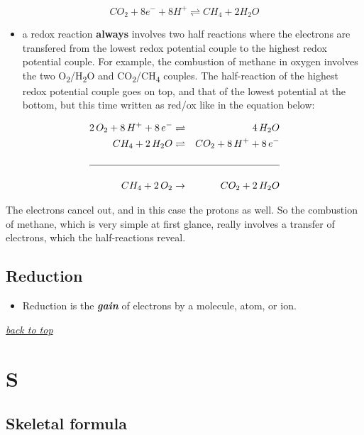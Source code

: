 \documentclass[]{book}
\providecommand{\tightlist}{%
  \setlength{\itemsep}{0pt}\setlength{\parskip}{0pt}}
\theoremstyle{definition}
\theoremstyle{definition}
\theoremstyle{definition}
\theoremstyle{remark}
\begin{document}
\begin{equation}
CO_2 + 8 e^- + 8 H^+ \rightleftharpoons CH_4 + 2 H_2O
\end{equation}

\begin{itemize}
\tightlist
\item
  a redox reaction \textbf{always} involves two half reactions where the
  electrons are transfered from the lowest redox potential couple to the
  highest redox potential couple. For example, the combustion of methane
  in oxygen involves the two O\textsubscript{2}/H\textsubscript{2}O and
  CO\textsubscript{2}/CH\textsubscript{4} couples. The half-reaction of
  the highest redox potential couple goes on top, and that of the lowest
  potential at the bottom, but this time written as red/ox like in the
  equation below:
\end{itemize}

\begin{align}
2\,O_2 + 8\,H^+ + 8\,e^- & \rightleftharpoons & 4\,H_2O\\
CH_4 + 2\,H_2O & \rightleftharpoons & CO_2 + 8\,H^+ + 8\,e^-\\
& &\\
\hline\\
CH_4 + 2\,O_2 & \to & CO_2 + 2\,H_2O
\end{align}

The electrons cancel out, and in this case the protons as well. So the
combustion of methane, which is very simple at first glance, really
involves a transfer of electrons, which the half-reactions reveal.

\hypertarget{reduction}{\subsection{Reduction}\label{reduction}}

\begin{itemize}
\tightlist
\item
  Reduction is the \emph{\textbf{gain}} of electrons by a molecule,
  atom, or ion.
\end{itemize}

\emph{\protect\hyperlink{top}{back to top}}

\section{S}\label{s}

\hypertarget{skeletal-formula}{\subsection{Skeletal
formula}\label{skeletal-formula}}
\end{document}
